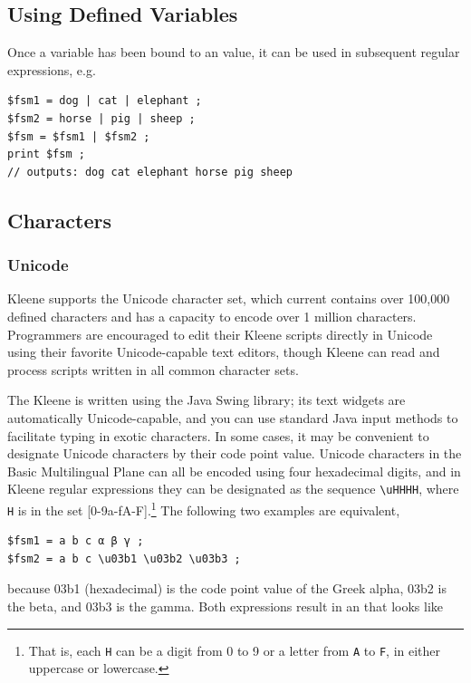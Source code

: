\subsection{Using Defined Variables}

Once a variable has been bound to an \fsm{} value, it can be used in subsequent regular
expressions, e.g.

\begin{Verbatim}
$fsm1 = dog | cat | elephant ;
$fsm2 = horse | pig | sheep ;
$fsm = $fsm1 | $fsm2 ;
print $fsm ;
// outputs: dog cat elephant horse pig sheep
\end{Verbatim}


\subsection{Characters}

\subsubsection{Unicode}

Kleene supports the Unicode character set, 
which current contains over 100,000 defined characters and has a capacity
to encode over 1 million characters.  Programmers are encouraged to edit their Kleene scripts
directly in Unicode using their favorite Unicode-capable text editors, though Kleene 
can read and process scripts written in all common character sets.  

The Kleene \gui{} is written using the Java Swing library; its text widgets are
automatically Unicode-capable, and you can use standard Java input methods to facilitate
typing in exotic characters.  In some cases, it may be convenient to designate Unicode
characters by their code point value.  Unicode characters in the Basic Multilingual Plane
can all be encoded using four hexadecimal digits, and in Kleene regular expressions they
can be designated as the  sequence \verb!\uHHHH!, where \texttt{H} is in the
set [0-9a-fA-F].\footnote{That is, each \texttt{H} can be a digit from 0 to 9 or a letter
from \texttt{A} to \texttt{F}, in either uppercase or lowercase.}  The following two
examples are equivalent,


\begin{Verbatim}
$fsm1 = a b c α β γ ;
$fsm2 = a b c \u03b1 \u03b2 \u03b3 ;
\end{Verbatim}

\noindent
because 03b1 (hexadecimal) is the code point value of the Greek alpha, 03b2 is the beta,
and 03b3 is the gamma.  Both expressions result in an \fsm{} that looks like



